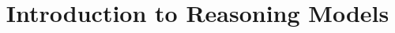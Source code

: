 \documentclass[xcolor=dvipsnames,compress,t,pdf,9pt]{beamer}
\title[\insertframenumber /\inserttotalframenumber]{Introduction to Reasoning Models}
\begin{document}
	\begin{frame}
	\titlepage
	\end{frame}
	

%	
	
	
\end{document}
